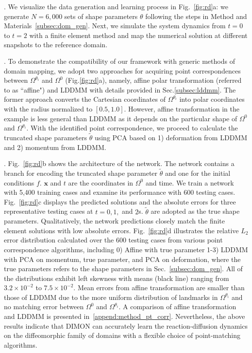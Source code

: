 \documentclass[review]{elsarticle}
\def\Omegathetai{{\Omega^{\theta_i}}}
\def\refd{0}
\def\Omegaref{{\Omega^\refd}}
\begin{document}
. We visualize the data generation and learning process in Fig.~\ref{fig:rd}a: we generate $N=6,000$ sets of shape parameters $\theta$ following the steps in Method and Materials~\ref{subsec:dom_gen}. Next, we simulate the system dynamics from $t=0$ to $t=2$ with a finite element method and map the numerical solution at different snapshots to the reference domain. 

. To demonstrate the compatibility of our framework with generic methods of domain mapping, we adopt two approaches for acquiring point correspondences between $\Omegathetai$ and $\Omegaref$ (Fig.\ref{fig:rd}a), namely, affine polar transformation (referred to as ``affine") and LDDMM with details provided in Sec.\ref{subsec:lddmm}. The former approach converts the Cartesian coordinates of $\Omegathetai$ into polar coordinates with the radius normalized to $[0.5, 1.0]$. However, affine transformation in the example is less general than LDDMM as it depends on the particular shape of $\Omegaref$ and $\Omegathetai$. With the identified point correspondence, we proceed to calculate the truncated shape parameters $\tilde \theta$ using PCA based on 1) deformation from LDDMM and 2) momentum from LDDMM.

.
Fig.~\ref{fig:rd}b shows the architecture of the network. The network contains a branch for encoding the truncated shape parameter $\tilde{\theta}$ and one for the initial conditions $f$. $\mathbf{x}$ and $t$ are the coordinates in $\Omegaref$ and time.
We train a network with 5,400 training cases and examine its performance with 600 testing cases. Fig.~\ref{fig:rd}c displays the predicted solutions and the absolute errors for three representative testing cases at $t=0, 1,$ and $2$s. $\tilde \theta$ are adopted as the true shape parameters. Qualitatively, the network predictions closely match the finite element solutions with low absolute errors. Fig.~\ref{fig:rd}d illustrates the relative $L_2$ error distribution calculated over the 600 testing cases from various point correspondence algorithms, including 0) Affine with true parameter 1-3) LDDMM with PCA on momentum, true parameter, and PCA on deformation, where the true parameters refers to the shape parameters in Sec.~\ref{subsec:dom_gen}. All of the distributions exhibit left skewness with means (black line) ranging from $3.2\times10^{-2}$ to $7.5\times10^{-2}$. Mean errors from affine transformation are smaller than those of LDDMM due to the more uniform distribution of landmarks in $\Omegathetai$ and no matching error between $\Omegaref$ and $\Omegathetai$. A comparison of affine transformation and LDDMM is presented in~\ref{append:method_pt_corr}. Nevertheless, the above results indicate that DIMON can accurately learn the reaction-diffusion dynamics on the diffeomorphic family of domains with a flexible choice of point-matching algorithms.
\end{document}
